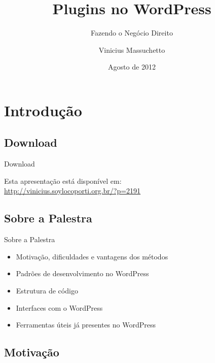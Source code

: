 \documentclass{beamer}
\title{Plugins no WordPress}
\subtitle{Fazendo o Negócio Direito}
\author{Vinicius Massuchetto}
\institute{WordCamp São Paulo 2012}
\date{Agosto de 2012}
\begin{document}
\frame{\titlepage}

\section{Introdução}

\subsection{Download}

\begin{frame}{Download}
  \begin{center}
    Esta apresentação está disponível em: \\
    \url{http://vinicius.soylocoporti.org.br/?p=2191}
  \end{center}
\end{frame}

\subsection{Sobre a Palestra}

\begin{frame}{Sobre a Palestra}
\begin{itemize}
  \pause \item Motivação, dificuldades e vantagens dos métodos
  \pause \item Padrões de desenvolvimento no WordPress
  \pause \item Estrutura de código
  \pause \item Interfaces com o WordPress
  \pause \item Ferramentas úteis já presentes no WordPress
\end{itemize}
\end{frame}

\subsection{Motivação}
\end{document}
